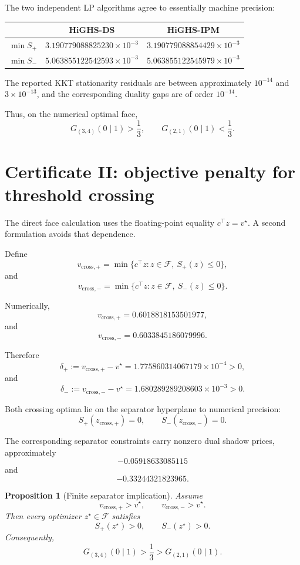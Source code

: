 \documentclass[11pt,a4paper]{article}
\newtheorem{proposition}[theorem]{Proposition}
\newcommand{\F}{\mathcal F}
\newcommand{\opt}{v^\star}
\newcommand{\Gp}{G_{(3,4)}(0\mid1)}
\newcommand{\Gm}{G_{(2,1)}(0\mid1)}
\begin{document}
The two independent LP algorithms agree to essentially machine precision:

\begin{center}
\begin{tabular}{lcc}
\toprule
 & HiGHS-DS & HiGHS-IPM\\
\midrule
\(\min S_+\)
&
\(3.190779088825230\times10^{-3}\)
&
\(3.190779088854429\times10^{-3}\)
\\[1mm]
\(\min S_-\)
&
\(5.063855122542593\times10^{-3}\)
&
\(5.063855122545979\times10^{-3}\)
\\
\bottomrule
\end{tabular}
\end{center}

The reported KKT stationarity residuals are between approximately
\(10^{-14}\) and \(3\times10^{-13}\), and the corresponding duality gaps are
of order \(10^{-14}\).

Thus, on the numerical optimal face,
\[
\Gp>\frac13,
\qquad
\Gm<\frac13.
\]

\section{Certificate II: objective penalty for threshold crossing}

The direct face calculation uses the floating-point equality
\(c^\top z=\opt\).  A second formulation avoids that dependence.

Define
\[
v_{\mathrm{cross},+}
=
\min\{c^\top z:z\in\F,\ S_+(z)\le0\},
\]
and
\[
v_{\mathrm{cross},-}
=
\min\{c^\top z:z\in\F,\ S_-(z)\le0\}.
\]

Numerically,
\[
v_{\mathrm{cross},+}
=
0.6018818153501977,
\]
and
\[
v_{\mathrm{cross},-}
=
0.6033845186079996.
\]

Therefore
\[
\boxed{
\delta_+
:=
v_{\mathrm{cross},+}-\opt
=
1.775860314067179\times10^{-4}>0,
}
\]
and
\[
\boxed{
\delta_-
:=
v_{\mathrm{cross},-}-\opt
=
1.680289289208603\times10^{-3}>0.
}
\]

Both crossing optima lie on the separator hyperplane to numerical precision:
\[
S_+(z_{\mathrm{cross},+})=0,
\qquad
S_-(z_{\mathrm{cross},-})=0.
\]

The corresponding separator constraints carry nonzero dual shadow prices,
approximately
\[
-0.05918633085115
\]
and
\[
-0.33244321823965.
\]

\begin{proposition}[Finite separator implication]
Assume
\[
v_{\mathrm{cross},+}>\opt,
\qquad
v_{\mathrm{cross},-}>\opt.
\]
Then every optimizer \(z^\star\in\F\) satisfies
\[
S_+(z^\star)>0,
\qquad
S_-(z^\star)>0.
\]
Consequently,
\[
\Gp>\frac13>\Gm.
\]
\end{proposition}
\end{document}
